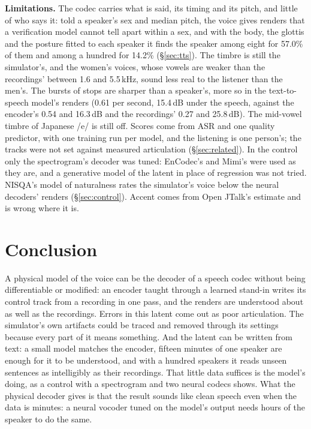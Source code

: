 \documentclass[10pt,a4paper,twocolumn]{article}
\begin{document}
\textbf{Limitations.} The codec carries what is said, its timing and its pitch, and little of who
says it: told a speaker's sex and median pitch, the voice gives renders that a verification
model cannot tell apart within a sex, and with the body, the glottis and the posture fitted to each speaker it finds
the speaker among eight for 57.0\% of them and among a hundred for 14.2\%
(\S\ref{sec:tts}).
The timbre is still the simulator's, and the women's voices, whose vowels are weaker than the
recordings' between 1.6 and 5.5\,kHz, sound less real to the listener than the men's. The bursts
of stops are sharper than a speaker's, more so in the text-to-speech model's renders (0.61 per
second, 15.4\,dB under the speech, against the encoder's 0.54 and 16.3\,dB and the recordings' 0.27
and 25.8\,dB). The mid-vowel timbre of Japanese /e/ is still off. Scores come from ASR and one
quality predictor, with one training run per model, and the listening is one person's; the
tracks were not set against measured articulation (\S\ref{sec:related}). In the
control only the spectrogram's decoder was tuned: EnCodec's and Mimi's were used as they are,
and a generative model of the latent in place of regression was not tried. NISQA's model of
naturalness rates the simulator's voice below the neural decoders' renders
(\S\ref{sec:control}). Accent comes from
Open JTalk's estimate and is wrong where it is.

\section{Conclusion}
A physical model of the voice can be the decoder of a speech codec without being differentiable
or modified: an encoder taught through a learned stand-in writes its control track from a
recording in one pass, and the renders are understood about as well as the recordings. Errors in
this latent come out as poor articulation. The simulator's own artifacts could be traced and
removed through its settings because every part of it means something. And the latent can be
written from text: a small model matches the encoder, fifteen minutes of one speaker are enough
for it to be understood, and with a hundred speakers it reads unseen sentences as intelligibly
as their recordings. That little data suffices is the model's doing, as a control with a
spectrogram and two neural codecs shows. What the physical decoder gives is that the result
sounds like clean speech even when the data is minutes: a neural vocoder tuned on the model's
output needs hours of the speaker to do the same.
\end{document}
